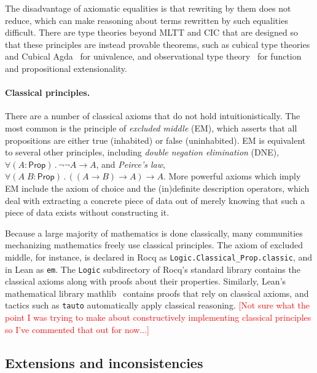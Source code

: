 \documentclass{article}
\newcommand{\note}[1]{\textcolor{red}{[#1]}}
\newcommand{\kw}[1]{\mathsf{#1}}
\newcommand{\code}[1]{\texttt{#1}}
\begin{document}
The disadvantage of axiomatic equalities is that rewriting by them does not reduce,
which can make reasoning about terms rewritten by such equalities difficult.
There are type theories beyond MLTT and CIC that are designed
so that these principles are instead provable theorems,
such as cubical type theories~\citep{bch,cchm,afh,cartesian}
and Cubical Agda~\citep{cubical-agda} for univalence,
and observational type theory~\citep{ott,ott-now,ttobs,ccobs,cicobs}
for function and propositional extensionality.

\paragraph{Classical principles.}
There are a number of classical axioms that do not hold intuitionistically.
The most common is the principle of \emph{excluded middle} (EM),
which asserts that all propositions are either true (inhabited) or false (uninhabited).
EM is equivalent to several other principles,
including \emph{double negation elimination} (DNE),
$\forall (A : \kw{Prop})\mathpunct{.} \neg \neg A \to A$,
and \emph{Peirce's law},
$\forall (A \; B : \kw{Prop})\mathpunct{.} ((A \to B) \to A) \to A$.
More powerful axioms which imply EM include the axiom of choice
and the (in)definite description operators,
which deal with extracting a concrete piece of data
out of merely knowing that such a piece of data exists without constructing it.

Because a large majority of mathematics is done classically,
many communities mechanizing mathematics freely use classical principles.
The axiom of excluded middle, for instance,
is declared in Rocq as \code{Logic.Classical\_Prop.classic},
and in Lean as \code{em}.
The \code{Logic} subdirectory of Rocq's standard library
contains the classical axioms along with proofs about their properties.
Similarly, Lean's mathematical library mathlib~\citep{mathlib}
contains proofs that rely on classical axioms,
and tactics such as \code{tauto} automatically apply classical reasoning.
\note{Not sure what the point I was trying to make
about constructively implementing classical principles
so I've commented that out for now...}

\subsection{Extensions and inconsistencies}
\end{document}
